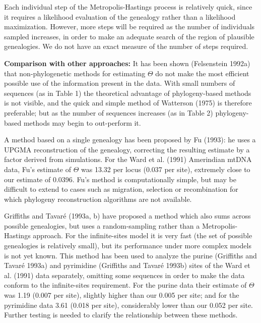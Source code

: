 \documentclass[12pt]{article}
\begin{document}
Each individual step of the Metropolis-Hastings process is
relatively quick, since it requires a likelihood evaluation of the genealogy
rather than a likelihood maximization. 
However, more steps will be
required as the number of individuals sampled increases, in order to
make an adequate search of the region of plausible genealogies.  We do not 
have an exact measure of the number of steps required.

\bigskip

{\bf Comparison with other approaches:}  It has been shown ({\sc Felsenstein}
1992a) that non-phylogenetic methods for estimating $\Theta$ do not make
the most efficient possible use of the information present in the data.
With small numbers of sequences (as in Table 1) the theoretical
advantage of phylogeny-based methods is not visible, and the quick and
simple method of {\sc Watterson} (1975) is therefore preferable; but as
the number of sequences increases (as in Table 2) phylogeny-based
methods may begin to out-perform it. 

A method based on a single genealogy has been proposed by {\sc Fu} (1993):  he
uses a UPGMA reconstruction of the genealogy, correcting the resulting
estimate by a factor derived from simulations.  For the {\sc Ward} et
al. (1991)
Amerindian mtDNA data, {\sc Fu}'s estimate of $\Theta$ was 13.32 per locus
(0.037 per site), extremely close to our estimate of 0.0396.  {\sc
Fu's} method 
is computationally simple, but may be difficult to extend to cases such
as migration, selection or recombination for which phylogeny reconstruction
algorithms are not available.

{\sc Griffiths} and {\sc Tavar\'{e}} (1993a, b) have proposed a method which also sums
across possible genealogies, but uses a random-sampling rather than a
Metropolis-Hastings approach.  For the infinite-sites model it is very
fast (the set of possible genealogies is relatively small), but its
performance under more complex models is not yet known.
This method has been used to analyze
the purine ({\sc Griffiths} and {\sc Tavar\'{e}} 1993a) and pyrimidine
({\sc Griffiths} and {\sc Tavar\'{e}} 1993b) sites of the {\sc Ward} et al. (1991) data
separately, omitting some sequences in order to make the data conform 
to the infinite-sites requirement.  For the purine data their estimate
of $\Theta$ was 1.19 (0.007 per site), slightly higher than our 0.005
per site; and for the pyrimidine data 3.61 (0.018 per site),
considerably lower than our 0.052 per site.  Further testing is needed
to clarify the relationship between these methods.
\end{document}
